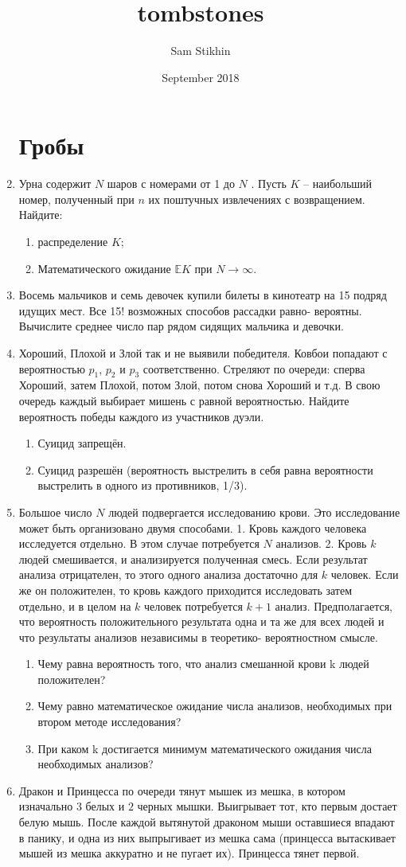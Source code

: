 \documentclass[a4paper, 14pt]{extarticle}
\title{tombstones}
\author{Sam Stikhin}
\date{September 2018}
\begin{document}
\begin{enumerate}
\section{Гробы}
	\item  Урна содержит $N$ шаров с номерами от 1 до $N$ . Пусть $K$ --
наибольший номер, полученный при $n$ их поштучных извлечениях с
возвращением. Найдите:	\begin{enumerate}
	\item  распределение $K$;
	\item Математического ожидание $\mathbb{E}K$ при $N\rightarrow\infty$.
\end{enumerate}
    \item Восемь мальчиков и семь девочек купили билеты в кинотеатр на
	15 подряд идущих мест. Все 15! возможных способов рассадки равно-
	вероятны. Вычислите среднее число пар рядом сидящих мальчика и
	девочки.
\item Хороший, Плохой и Злой так и не выявили победителя. Ковбои попадают с вероятностью $p_1$, $p_2$ и $p_3$ соответственно. Стреляют по очереди: сперва Хороший, затем Плохой, потом Злой, потом снова Хороший и т.д. В свою очередь каждый выбирает мишень с равной вероятностью. Найдите вероятность победы каждого из участников дуэли.
\begin{enumerate}
    \item Суицид запрещён.
    \item Суицид разрешён (вероятность выстрелить в себя равна вероятности выстрелить в одного из противников, 1/3).
\end{enumerate}
\item  Большое число $N$ людей подвергается исследованию
	крови. Это исследование может быть организовано двумя
	способами. 1. Кровь каждого человека исследуется отдельно.
	В этом случае потребуется $N$ анализов. 2. Кровь $k$ людей
	смешивается, и анализируется полученная смесь. Если  
	результат анализа отрицателен, то этого одного анализа  
	достаточно для $k$ человек. Если же он положителен, то кровь  
	каждого приходится исследовать затем отдельно, и в целом на $k$
	человек потребуется $k+1$ анализ. Предполагается, что  
	вероятность положительного результата одна и та же для всех
	людей и что результаты анализов независимы в теоретико-
	вероятностном смысле.
	\begin{enumerate}
		\item Чему равна вероятность того, что анализ смешанной
	крови k людей положителен?
	\item Чему равно математическое ожидание числа анализов, необходимых при
	втором методе исследования?
	\item При каком k достигается минимум математического ожидания числа  
	необходимых анализов?
	\end{enumerate}
 \item Дракон и Принцесса по очереди тянут мышек из мешка, в котором изначально $3$ белых и $2$ черных мышки. Выигрывает тот, кто первым достает белую мышь. После каждой вытянутой драконом мыши оставшиеся впадают в панику, и одна из них выпрыгивает из мешка сама (принцесса вытаскивает мышей из мешка аккуратно и не пугает их). Принцесса тянет первой.


\end{enumerate}
\end{document}

